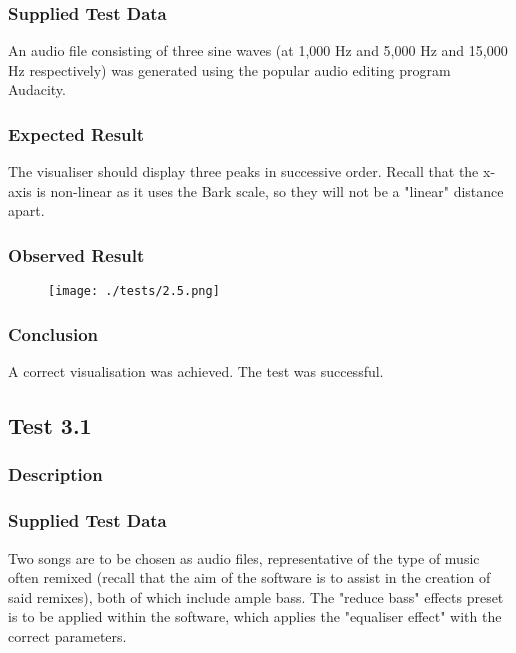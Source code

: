 \subsubsection*{Supplied Test Data}
An audio file consisting of three sine waves (at 1,000 Hz and 5,000 Hz and 15,000 Hz respectively) was generated using the popular audio editing program Audacity.

\subsubsection*{Expected Result}
The visualiser should display three peaks in successive order. Recall that the x-axis is non-linear as it uses the Bark scale, so they will not be a "linear" distance apart.

\subsubsection*{Observed Result}
\label{sec:evidence2.5}
\begin{figure}[H]
	\texttt{[image: ./tests/2.5.png]}
\end{figure}

\subsubsection*{Conclusion}
A correct visualisation was achieved. The test was successful.


\pagebreak
\subsection{Test 3.1}
\subsubsection*{Description}
\paragraph{}
{
	\centering
}

\subsubsection*{Supplied Test Data}
Two songs are to be chosen as audio files, representative of the type of music often remixed (recall that the aim of the software is to assist in the creation of said remixes), both of which include ample bass. The "reduce bass" effects preset is to be applied within the software, which applies the "equaliser effect" with the correct parameters.

